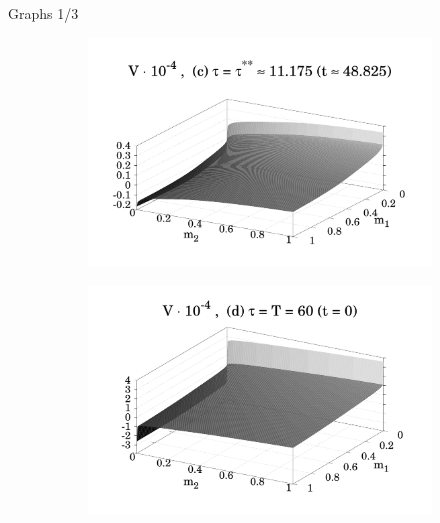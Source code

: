 \documentclass{beamer}
\begin{document}
\begin{frame}{Graphs 1/3}
\begin{figure}
\begin{subfigure}{.48 \textwidth}
            \includegraphics[width = \textwidth]{figures/Figure_4c_1.pdf}
            \label{fig_4_c}
        \end{subfigure}
        \begin{subfigure}{.48 \textwidth}
            \includegraphics[width = \textwidth]{figures/Figure_4d_1.pdf}
            \label{fig_4_d}
        \end{subfigure}
    \label{Fig_4}
    \end{figure}
\end{frame}
\end{document}
